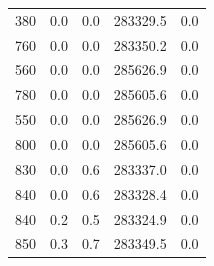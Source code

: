 \begin{longtable}{rrrrr}
    380 & \num{0.0} & \num{0.0} & \num{283329.5} & 0.0 \\
    760 & \num{0.0} & \num{0.0} & \num{283350.2} & 0.0 \\
    560 & \num{0.0} & \num{0.0} & \num{285626.9} & 0.0 \\
    780 & \num{0.0} & \num{0.0} & \num{285605.6} & 0.0 \\
    550 & \num{0.0} & \num{0.0} & \num{285626.9} & 0.0 \\
    800 & \num{0.0} & \num{0.0} & \num{285605.6} & 0.0 \\
    830 & \num{0.0} & \num{0.6} & \num{283337.0} & 0.0 \\
    840 & \num{0.0} & \num{0.6} & \num{283328.4} & 0.0 \\
    840 & \num{0.2} & \num{0.5} & \num{283324.9} & 0.0 \\
    850 & \num{0.3} & \num{0.7} & \num{283349.5} & 0.0 \\
\end{longtable}
\endgroup
